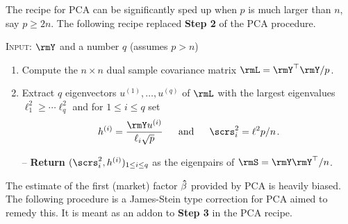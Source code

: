 \documentclass[leqno,12pt]{article}
\begin{document}
{The recipe for PCA can be significantly sped up when $p$ is 
much larger than $n$, say $p \ge 2n$. The following recipe
replaced {\bf Step 2} of the PCA procedure.

\begin{mdframed}[style=clean]
\textsc{Input:} $\rmY$ and a number $q$ (assumes $p > n$)
\begin{enumerate}
\item Compute the $n \times n$ 
dual sample covariance matrix $\rmL = \rmY^\top \rmY/p$.
\item Extract $q$ eigenvectors $u^{(1)}, \dots, u^{(q)}$ of
$\rmL$
with the largest eigenvalues $\ell^2_1 \ge \cdots \ell^2_q$ and
for $1 \le i \le q$ set 
\begin{align*}
  h^{(i)} = \frac{\rmY u^{(i)}}{\ell_i \sqrt{p}} 
  \s[16] \text{and} \s[16]
  \scrs^2_i = \ell^2 p/n \s .
\end{align*}
\item[--] {\bf Return} $(\scrs^2_i, h^{(i)})_{1 \le 
i\le q}$
as the eigenpairs of $\rmS = \rmY\rmY^\top /n$.
\end{enumerate}
\end{mdframed}

The estimate of the first (market) factor $\bm{\hat}{\beta}$
provided by PCA is heavily biased. The following procedure is a
James-Stein type correction for PCA aimed to remedy this. It is
meant as an addon to {\bf Step 3} in the PCA recipe.

}
\end{document}

